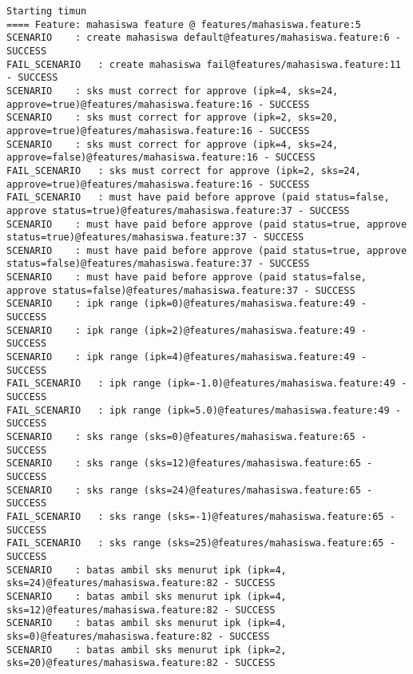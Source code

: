 \begin{lstlisting}[language=testresult]
Starting timun
==== Feature: mahasiswa feature @ features/mahasiswa.feature:5
SCENARIO	: create mahasiswa default@features/mahasiswa.feature:6 - SUCCESS
FAIL_SCENARIO	: create mahasiswa fail@features/mahasiswa.feature:11 - SUCCESS
SCENARIO	: sks must correct for approve (ipk=4, sks=24, approve=true)@features/mahasiswa.feature:16 - SUCCESS
SCENARIO	: sks must correct for approve (ipk=2, sks=20, approve=true)@features/mahasiswa.feature:16 - SUCCESS
SCENARIO	: sks must correct for approve (ipk=4, sks=24, approve=false)@features/mahasiswa.feature:16 - SUCCESS
FAIL_SCENARIO	: sks must correct for approve (ipk=2, sks=24, approve=true)@features/mahasiswa.feature:16 - SUCCESS
FAIL_SCENARIO	: must have paid before approve (paid status=false, approve status=true)@features/mahasiswa.feature:37 - SUCCESS
SCENARIO	: must have paid before approve (paid status=true, approve status=true)@features/mahasiswa.feature:37 - SUCCESS
SCENARIO	: must have paid before approve (paid status=true, approve status=false)@features/mahasiswa.feature:37 - SUCCESS
SCENARIO	: must have paid before approve (paid status=false, approve status=false)@features/mahasiswa.feature:37 - SUCCESS
SCENARIO	: ipk range (ipk=0)@features/mahasiswa.feature:49 - SUCCESS
SCENARIO	: ipk range (ipk=2)@features/mahasiswa.feature:49 - SUCCESS
SCENARIO	: ipk range (ipk=4)@features/mahasiswa.feature:49 - SUCCESS
FAIL_SCENARIO	: ipk range (ipk=-1.0)@features/mahasiswa.feature:49 - SUCCESS
FAIL_SCENARIO	: ipk range (ipk=5.0)@features/mahasiswa.feature:49 - SUCCESS
SCENARIO	: sks range (sks=0)@features/mahasiswa.feature:65 - SUCCESS
SCENARIO	: sks range (sks=12)@features/mahasiswa.feature:65 - SUCCESS
SCENARIO	: sks range (sks=24)@features/mahasiswa.feature:65 - SUCCESS
FAIL_SCENARIO	: sks range (sks=-1)@features/mahasiswa.feature:65 - SUCCESS
FAIL_SCENARIO	: sks range (sks=25)@features/mahasiswa.feature:65 - SUCCESS
SCENARIO	: batas ambil sks menurut ipk (ipk=4, sks=24)@features/mahasiswa.feature:82 - SUCCESS
SCENARIO	: batas ambil sks menurut ipk (ipk=4, sks=12)@features/mahasiswa.feature:82 - SUCCESS
SCENARIO	: batas ambil sks menurut ipk (ipk=4, sks=0)@features/mahasiswa.feature:82 - SUCCESS
SCENARIO	: batas ambil sks menurut ipk (ipk=2, sks=20)@features/mahasiswa.feature:82 - SUCCESS

\end{lstlisting}
